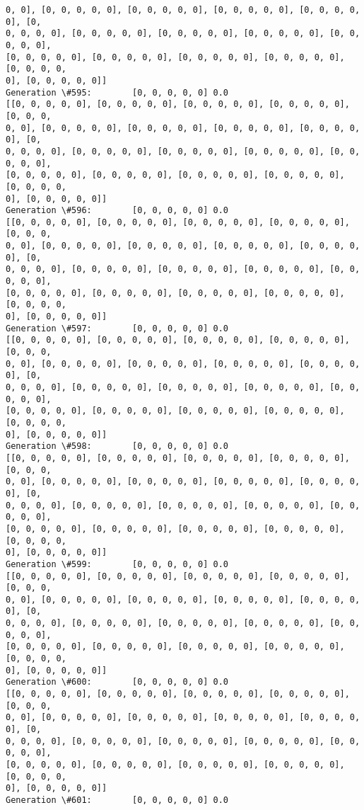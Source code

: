 \documentclass[11pt]{article}
\begin{document}
\begin{Verbatim}[commandchars=\\\{\}]
0, 0], [0, 0, 0, 0, 0], [0, 0, 0, 0, 0], [0, 0, 0, 0, 0], [0, 0, 0, 0, 0], [0,
0, 0, 0, 0], [0, 0, 0, 0, 0], [0, 0, 0, 0, 0], [0, 0, 0, 0, 0], [0, 0, 0, 0, 0],
[0, 0, 0, 0, 0], [0, 0, 0, 0, 0], [0, 0, 0, 0, 0], [0, 0, 0, 0, 0], [0, 0, 0, 0,
0], [0, 0, 0, 0, 0]]
Generation \#595:        [0, 0, 0, 0, 0] 0.0
[[0, 0, 0, 0, 0], [0, 0, 0, 0, 0], [0, 0, 0, 0, 0], [0, 0, 0, 0, 0], [0, 0, 0,
0, 0], [0, 0, 0, 0, 0], [0, 0, 0, 0, 0], [0, 0, 0, 0, 0], [0, 0, 0, 0, 0], [0,
0, 0, 0, 0], [0, 0, 0, 0, 0], [0, 0, 0, 0, 0], [0, 0, 0, 0, 0], [0, 0, 0, 0, 0],
[0, 0, 0, 0, 0], [0, 0, 0, 0, 0], [0, 0, 0, 0, 0], [0, 0, 0, 0, 0], [0, 0, 0, 0,
0], [0, 0, 0, 0, 0]]
Generation \#596:        [0, 0, 0, 0, 0] 0.0
[[0, 0, 0, 0, 0], [0, 0, 0, 0, 0], [0, 0, 0, 0, 0], [0, 0, 0, 0, 0], [0, 0, 0,
0, 0], [0, 0, 0, 0, 0], [0, 0, 0, 0, 0], [0, 0, 0, 0, 0], [0, 0, 0, 0, 0], [0,
0, 0, 0, 0], [0, 0, 0, 0, 0], [0, 0, 0, 0, 0], [0, 0, 0, 0, 0], [0, 0, 0, 0, 0],
[0, 0, 0, 0, 0], [0, 0, 0, 0, 0], [0, 0, 0, 0, 0], [0, 0, 0, 0, 0], [0, 0, 0, 0,
0], [0, 0, 0, 0, 0]]
Generation \#597:        [0, 0, 0, 0, 0] 0.0
[[0, 0, 0, 0, 0], [0, 0, 0, 0, 0], [0, 0, 0, 0, 0], [0, 0, 0, 0, 0], [0, 0, 0,
0, 0], [0, 0, 0, 0, 0], [0, 0, 0, 0, 0], [0, 0, 0, 0, 0], [0, 0, 0, 0, 0], [0,
0, 0, 0, 0], [0, 0, 0, 0, 0], [0, 0, 0, 0, 0], [0, 0, 0, 0, 0], [0, 0, 0, 0, 0],
[0, 0, 0, 0, 0], [0, 0, 0, 0, 0], [0, 0, 0, 0, 0], [0, 0, 0, 0, 0], [0, 0, 0, 0,
0], [0, 0, 0, 0, 0]]
Generation \#598:        [0, 0, 0, 0, 0] 0.0
[[0, 0, 0, 0, 0], [0, 0, 0, 0, 0], [0, 0, 0, 0, 0], [0, 0, 0, 0, 0], [0, 0, 0,
0, 0], [0, 0, 0, 0, 0], [0, 0, 0, 0, 0], [0, 0, 0, 0, 0], [0, 0, 0, 0, 0], [0,
0, 0, 0, 0], [0, 0, 0, 0, 0], [0, 0, 0, 0, 0], [0, 0, 0, 0, 0], [0, 0, 0, 0, 0],
[0, 0, 0, 0, 0], [0, 0, 0, 0, 0], [0, 0, 0, 0, 0], [0, 0, 0, 0, 0], [0, 0, 0, 0,
0], [0, 0, 0, 0, 0]]
Generation \#599:        [0, 0, 0, 0, 0] 0.0
[[0, 0, 0, 0, 0], [0, 0, 0, 0, 0], [0, 0, 0, 0, 0], [0, 0, 0, 0, 0], [0, 0, 0,
0, 0], [0, 0, 0, 0, 0], [0, 0, 0, 0, 0], [0, 0, 0, 0, 0], [0, 0, 0, 0, 0], [0,
0, 0, 0, 0], [0, 0, 0, 0, 0], [0, 0, 0, 0, 0], [0, 0, 0, 0, 0], [0, 0, 0, 0, 0],
[0, 0, 0, 0, 0], [0, 0, 0, 0, 0], [0, 0, 0, 0, 0], [0, 0, 0, 0, 0], [0, 0, 0, 0,
0], [0, 0, 0, 0, 0]]
Generation \#600:        [0, 0, 0, 0, 0] 0.0
[[0, 0, 0, 0, 0], [0, 0, 0, 0, 0], [0, 0, 0, 0, 0], [0, 0, 0, 0, 0], [0, 0, 0,
0, 0], [0, 0, 0, 0, 0], [0, 0, 0, 0, 0], [0, 0, 0, 0, 0], [0, 0, 0, 0, 0], [0,
0, 0, 0, 0], [0, 0, 0, 0, 0], [0, 0, 0, 0, 0], [0, 0, 0, 0, 0], [0, 0, 0, 0, 0],
[0, 0, 0, 0, 0], [0, 0, 0, 0, 0], [0, 0, 0, 0, 0], [0, 0, 0, 0, 0], [0, 0, 0, 0,
0], [0, 0, 0, 0, 0]]
Generation \#601:        [0, 0, 0, 0, 0] 0.0

\end{Verbatim}
\end{document}
